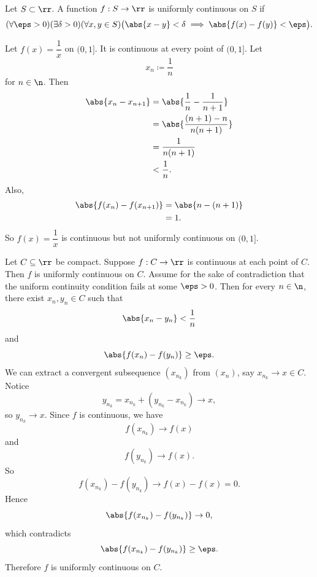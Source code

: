 

\begin{definition}
    Let $S\subset\rr$.
    A function $f : S\to\rr$ is uniformly continuous on $S$ if
    \[
        (\forall\eps>0)(\exists\delta>0)(\forall x,y\in S)\bigl(\abs{x-y}<\delta \implies \abs{f(x)-f(y)}<\eps\bigr).
    \]
\end{definition}

\begin{example}
    Let $f(x) = \dfrac{1}{x}$ on $(0,1]$.
    It is continuous at every point of $(0,1]$.
    Let
    \[
        x_n \coloneqq \dfrac{1}{n}
    \]
    for $n\in\n$.
    Then
    \begin{align*}
        \abs{x_n - x_{n+1}}
        &= \abs{\dfrac{1}{n} - \dfrac{1}{n+1}}\\
        &= \abs{\dfrac{(n+1)-n}{n(n+1)}}\\
        &= \dfrac{1}{n(n+1)}\\
        &< \dfrac{1}{n}.
    \end{align*}
    Also,
    \begin{align*}
        \abs{f(x_n)-f(x_{n+1})}
        &= \abs{n-(n+1)}\\
        &= 1.
    \end{align*}
    So $f(x) = \dfrac{1}{x}$ is continuous but not uniformly continuous on $(0,1]$.
\end{example}

\begin{theorem}{
    Let $C\subseteq\rr$ be compact.
    Suppose $f:C\to\rr$ is continuous at each point of $C$.
    Then $f$ is uniformly continuous on $C$.
}
	Assume for the sake of contradiction that the uniform continuity condition fails at some $\eps > 0$.
    Then for every $n\in\n$, there exist $x_n,y_n\in C$ such that
    \[
        \abs{x_n - y_n}< \dfrac{1}{n}
    \]
    and
    \[
        \abs{f(x_n) - f(y_n)}\geq\eps.
    \]
    We can extract a convergent subsequence $(x_{n_k})$ from $(x_n)$, say $x_{n_k}\to x\in C$.
    Notice
    \[
        y_{n_k} = x_{n_k} + (y_{n_k} - x_{n_k})\to x,
    \]
    so $y_{n_k}\to x$.
    Since $f$ is continuous, we have
    \[
        f(x_{n_k})\to f(x)
    \]
    and
    \[
        f(y_{n_k})\to f(x).
    \]
    So
    \[
        f(x_{n_k}) - f(y_{n_k})\to f(x) - f(x) = 0.
    \]
    Hence
    \[
        \abs{f(x_{n_k}) - f(y_{n_k})}\to 0,
    \]
    which contradicts
    \[
        \abs{f(x_{n_k}) - f(y_{n_k})}\geq\eps.
    \]
    Therefore $f$ is uniformly continuous on $C$.
\end{theorem}
